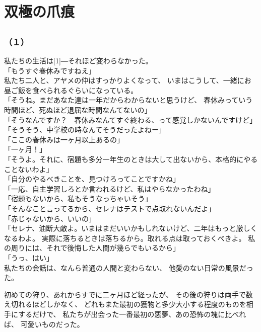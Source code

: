 \documentclass[../IHMain]{subfiles}
\begin{document}
\chapter{双極の爪痕}
\section{}
\subsection*{（１）}
私たちの生活は\scalebox{3}[1]{―}それほど変わらなかった。\\
「もうすぐ春休みですねえ」\\
私たち二人と、アヤメの仲はすっかりよくなって、
いまはこうして、一緒にお昼ご飯を食べられるぐらいになっている。\\
「そうね。まだあなた達は一年だからわからないと思うけど、
春休みっていう時間ほど、死ぬほど退屈な時間なんてないの」\\
「そうなんですか？　春休みなんてすぐ終わる、って感覚しかないんですけど」\\
「そうそう、中学校の時なんてそうだったよねー」\\
「ここの春休みは一ヶ月以上あるの」\\
「一ヶ月！」\\
「そうよ。それに、宿題も多分一年生のときは大して出ないから、本格的にやることないわよ」\\
「自分のやるべきことを、見つけろってことですかね」\\
「一応、自主学習しろとか言われるけど、私はやらなかったわね」\\
「宿題もないから、私もそうなっちゃいそう」\\
「そんなこと言ってるから、セレナはテストで点取れないんだよ」\\
「赤じゃないから、いいの」\\
「セレナ、油断大敵よ。いまはまだいいかもしれないけど、二年はもっと厳しくなるわよ。
実際に落ちるときは落ちるから。取れる点は取っておくべきよ。
私の周りには、それで後悔した人間が幾らでもいるから」\\
「うっ、はい」\\
私たちの会話は、なんら普通の人間と変わらない、
他愛のない日常の風景だった。

初めての狩り、あれからすでに二ヶ月ほど経ったが、
その後の狩りは両手で数え切れるほどしかなく、
どれもまた最初の獲物と多少大小する程度のものを相手にするだけで、
私たちが出会った一番最初の悪夢、あの恐怖の塊に比べれば、
可愛いものだった。
\end{document}
